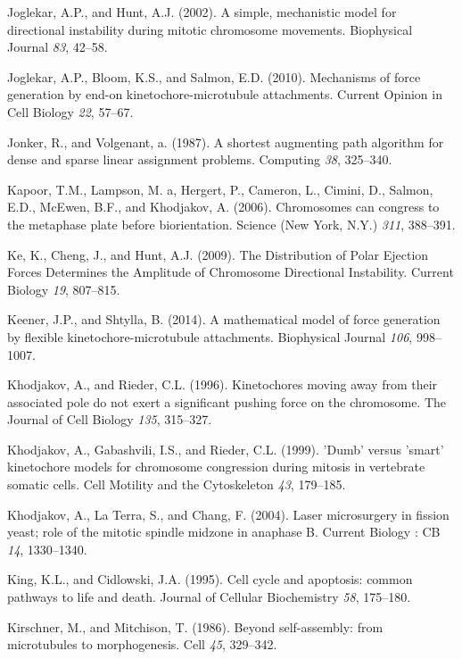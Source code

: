 \documentclass[12pt,a4paper,twoside,openright]{book}
\begin{document}
\hypertarget{ref-Joglekar2002}{}
Joglekar, A.P., and Hunt, A.J. (2002). A simple, mechanistic model for
directional instability during mitotic chromosome movements. Biophysical
Journal \emph{83}, 42--58.

\hypertarget{ref-Joglekar2010a}{}
Joglekar, A.P., Bloom, K.S., and Salmon, E.D. (2010). Mechanisms of
force generation by end-on kinetochore-microtubule attachments. Current
Opinion in Cell Biology \emph{22}, 57--67.

\hypertarget{ref-Jonker1987}{}
Jonker, R., and Volgenant, a. (1987). A shortest augmenting path
algorithm for dense and sparse linear assignment problems. Computing
\emph{38}, 325--340.

\hypertarget{ref-Kapoor2006}{}
Kapoor, T.M., Lampson, M. a, Hergert, P., Cameron, L., Cimini, D.,
Salmon, E.D., McEwen, B.F., and Khodjakov, A. (2006). Chromosomes can
congress to the metaphase plate before biorientation. Science (New York,
N.Y.) \emph{311}, 388--391.

\hypertarget{ref-Ke2009}{}
Ke, K., Cheng, J., and Hunt, A.J. (2009). The Distribution of Polar
Ejection Forces Determines the Amplitude of Chromosome Directional
Instability. Current Biology \emph{19}, 807--815.

\hypertarget{ref-Keener2014}{}
Keener, J.P., and Shtylla, B. (2014). A mathematical model of force
generation by flexible kinetochore-microtubule attachments. Biophysical
Journal \emph{106}, 998--1007.

\hypertarget{ref-Khodjakov1996}{}
Khodjakov, A., and Rieder, C.L. (1996). Kinetochores moving away from
their associated pole do not exert a significant pushing force on the
chromosome. The Journal of Cell Biology \emph{135}, 315--327.

\hypertarget{ref-Khodjakov1999}{}
Khodjakov, A., Gabashvili, I.S., and Rieder, C.L. (1999). 'Dumb' versus
'smart' kinetochore models for chromosome congression during mitosis in
vertebrate somatic cells. Cell Motility and the Cytoskeleton \emph{43},
179--185.

\hypertarget{ref-Khodjakov2004}{}
Khodjakov, A., La Terra, S., and Chang, F. (2004). Laser microsurgery in
fission yeast; role of the mitotic spindle midzone in anaphase B.
Current Biology : CB \emph{14}, 1330--1340.

\hypertarget{ref-King1995}{}
King, K.L., and Cidlowski, J.A. (1995). Cell cycle and apoptosis: common
pathways to life and death. Journal of Cellular Biochemistry \emph{58},
175--180.

\hypertarget{ref-Kirschner1986}{}
Kirschner, M., and Mitchison, T. (1986). Beyond self-assembly: from
microtubules to morphogenesis. Cell \emph{45}, 329--342.
\end{document}
